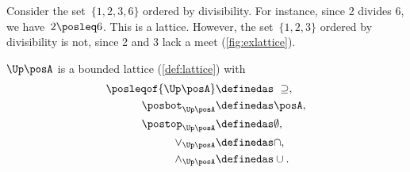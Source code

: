 \begin{example}
	Consider the set~$\{1,2,3,6\}$ ordered by divisibility.
	For instance, since 2 divides 6, we have~$2\posleq 6$.
	This is a lattice.
	However, the set~$\{1,2,3\}$ ordered by divisibility is not, since 2 and 3 lack a meet (\cref{fig:exlattice}).
\end{example}

\begin{lemma}
	\label{lem:u_bounded_lat}
	$\Up \posA$ is a bounded lattice (\cref{def:lattice}) with
	\begin{equation}
		\begin{aligned}
			\posleqof{\Up \posA} & \definedas \ \supseteq, \\
			\posbot_{\Up \posA}  & \definedas \posA,       \\
			\postop_{\Up \posA}  & \definedas \emptyset,   \\
			\vee_{\Up \posA}     & \definedas \cap,        \\
			\wedge_{\Up \posA}   & \definedas \cup.
		\end{aligned}
	\end{equation}
\end{lemma}
